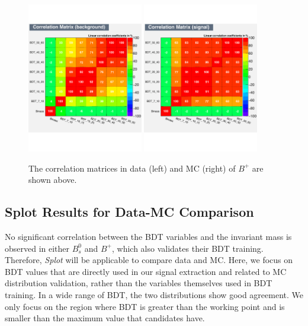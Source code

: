 \begin{figure}[h]
\begin{center}
\includegraphics[width=0.45\textwidth]{Figures/Chapter5/BPBDTCorrB.pdf}
\includegraphics[width=0.45\textwidth]{Figures/Chapter5/BPBDTCorrS.pdf}
\caption{The correlation matrices in data (left) and MC (right) of $B^+$ are shown above.}
\label{BPBDTCorr}
\end{center}
\end{figure}

\subsection{\textbf{Splot} Results for Data-MC Comparison}



No significant correlation between the BDT variables and the invariant mass is observed in either $B^0_s$ and $B^+$, which also validates their BDT training. Therefore, \textit{Splot} will be applicable to compare data and MC. Here, we focus on BDT values that are directly used in our signal extraction and related to MC distribution validation, rather than the variables themselves used in BDT training. In a wide range of BDT, the two distributions show good agreement. We only focus on the region where BDT is greater than the working point and is smaller than the maximum value that candidates have.

